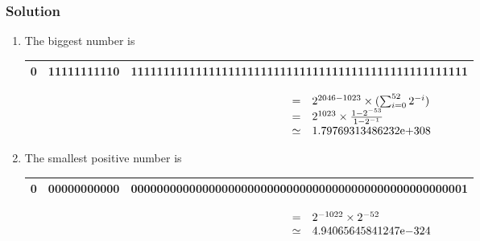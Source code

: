 \documentclass{beamer}
\newcounter{exo}
\newcommand{\exo}{
  \addtocounter{exo}{1}
  Exercice \arabic{exo}
}
\begin{document}

\ifanswers
\begin{frame}%
\frametitle{Solution}

\scriptsize

\begin{enumerate}
\item The biggest number is\\
  \vspace{0.2cm}
  \begin{tabular}{|c|c|c|}
    \hline
    0 & 11111111110 & 1111111111111111111111111111111111111111111111111111\\
    \hline
  \end{tabular}
  $$
  \begin{array}{l l}
    = & 2^{2046 - 1023}\times(\sum_{i = 0}^{52} 2^{-i})\\
    = & 2^{1023}\times\frac{1-2^{-53}}{1-2^{-1}}\\
    \simeq & 1.79769313486232\mathrm{e}{+308}\\
  \end{array}
  $$
\item The smallest positive number is\\
    \vspace{0.2cm}
  \begin{tabular}{|c|c|c|}
    \hline
    0 & 00000000000 & 0000000000000000000000000000000000000000000000000001\\
    \hline
  \end{tabular}
  $$
  \begin{array}{l l}
    = & 2^{-1022}\times 2^{-52}\\
    \simeq & 4.94065645841247\mathrm{e}{-324}\\
  \end{array}
  $$
\end{enumerate}

\end{frame}
\fi
\end{document}
